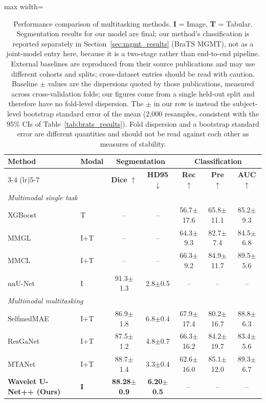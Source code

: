 \documentclass[conference]{IEEEtran}
\begin{document}
\begin{table}[!t]
\centering
\caption{Performance comparison of multitasking methods. \textbf{I} = Image, \textbf{T} = Tabular. Segmentation results for our model are final; our method's classification is reported separately in Section~\ref{sec:mgmt_results} (BraTS MGMT), not as a joint-model entry here, because it is a two-stage rather than end-to-end pipeline. External baselines are reproduced from their source publications and may use different cohorts and splits; cross-dataset entries should be read with caution. Baseline $\pm$ values are the dispersions quoted by those publications, measured across cross-validation folds; our figures come from a single held-out split and therefore have no fold-level dispersion. The $\pm$ in our row is instead the subject-level bootstrap standard error of the mean (2,000 resamples, consistent with the 95\% CIs of Table~\ref{tab:brats_results}). Fold dispersion and a bootstrap standard error are different quantities and should not be read against each other as measures of stability.}
\label{tab:multitask}
\begin{adjustbox}{max width=\textwidth}
\begin{tabular}{llccccc}
\toprule
\multirow{2}{*}{\textbf{Method}} &
\multirow{2}{*}{\textbf{Modal}} &
\multicolumn{2}{c}{\textbf{Segmentation}} &
\multicolumn{3}{c}{\textbf{Classification}} \\
\cmidrule(lr){3-4} \cmidrule(lr){5-7}
& & \textbf{Dice} $\uparrow$ & \textbf{HD95} $\downarrow$
& \textbf{Rec} $\uparrow$ & \textbf{Pre} $\uparrow$
& \textbf{AUC} $\uparrow$ \\
\midrule
\multicolumn{7}{l}{\textit{Multimodal single task}} \\
\midrule
XGBoost & T & -- & -- & 56.7$\pm$17.6 & 65.8$\pm$11.1 & 85.2$\pm$9.3 \\
MMGL & I+T & -- & -- & 64.3$\pm$9.3 & 82.7$\pm$7.4 & 84.5$\pm$6.8 \\
MMCL & I+T & -- & -- & 66.3$\pm$9.2 & 84.9$\pm$11.7 & 89.5$\pm$5.6 \\
nnU-Net & I & 91.3$\pm$1.3 & 2.8$\pm$0.5 & -- & -- & -- \\
\midrule
\multicolumn{7}{l}{\textit{Multimodal multitasking}} \\
\midrule
SelfmedMAE & I+T & 86.9$\pm$1.8 & 6.8$\pm$0.4 & 67.9$\pm$17.4 & 80.2$\pm$16.7 & 88.8$\pm$6.3 \\
ResGaNet & I+T & 87.5$\pm$1.2 & 4.8$\pm$0.7 & 66.3$\pm$16.2 & 84.2$\pm$19.7 & 83.4$\pm$5.6 \\
MTANet & I+T & 88.7$\pm$1.4 & 3.3$\pm$0.4 & 62.6$\pm$16.0 & 85.1$\pm$12.0 & 89.3$\pm$6.7 \\
\midrule
\textbf{Wavelet U-Net++ (Ours)} & \textbf{I} & \textbf{88.28$\pm$0.9} & \textbf{6.20$\pm$0.5} & -- & -- & -- \\
\bottomrule
\end{tabular}
\end{adjustbox}
\end{table}
\end{document}
